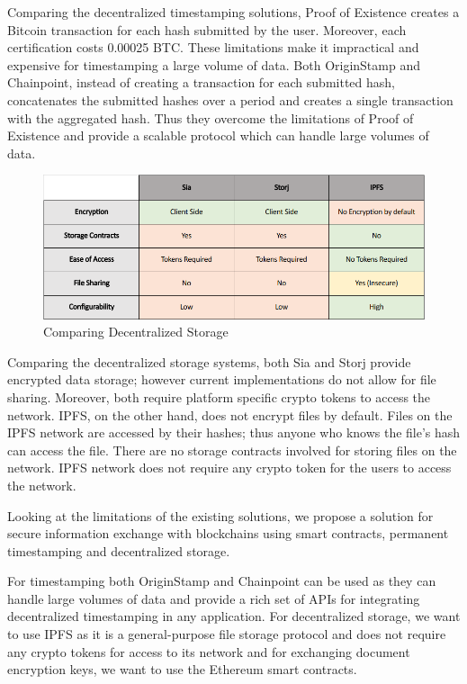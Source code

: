 \documentclass[]{article}
\begin{document}
		Comparing the decentralized timestamping solutions, Proof of Existence creates a Bitcoin transaction for each hash submitted by the user. Moreover, each certification costs 0.00025 BTC. These limitations make it impractical and expensive for timestamping a large volume of data. Both OriginStamp and Chainpoint, instead of creating a transaction for each submitted hash, concatenates the submitted hashes over a period and creates a single transaction with the aggregated hash. Thus they overcome the limitations of Proof of Existence and provide a scalable protocol which can handle large volumes of data.
	
		\begin{figure}[h]
			\includegraphics[width=\linewidth]{comparison-storage.png}
			\caption{Comparing Decentralized Storage}
			\label{fig:comparison-storage}
		\end{figure}
	
		Comparing the decentralized storage systems, both Sia and Storj provide encrypted data storage; however current implementations do not allow for file sharing. Moreover, both require platform specific crypto tokens to access the network. IPFS, on the other hand, does not encrypt files by default. Files on the IPFS network are accessed by their hashes; thus anyone who knows the file’s hash can access the file. There are no storage contracts involved for storing files on the network. IPFS network does not require any crypto token for the users to access the network.
		
		Looking at the limitations of the existing solutions, we propose a solution for secure information exchange with blockchains using smart contracts, permanent timestamping and decentralized storage.
		
		For timestamping both OriginStamp and Chainpoint can be used as they can handle large volumes of data and provide a rich set of APIs for integrating decentralized timestamping in any application. For decentralized storage, we want to use IPFS as it is a general-purpose file storage protocol and does not require any crypto tokens for access to its network and for exchanging document encryption keys, we want to use the Ethereum smart contracts.
	
\end{document}
